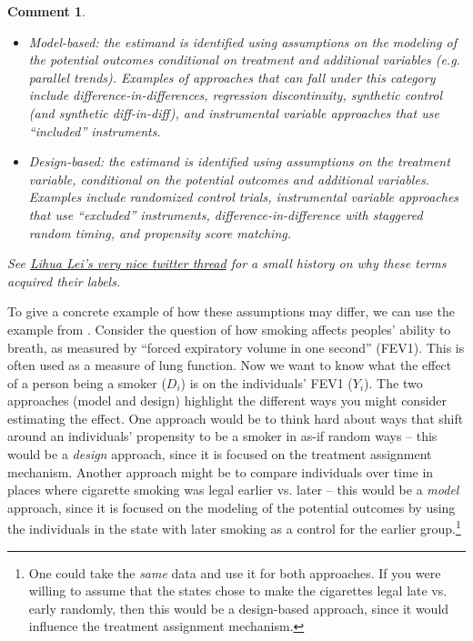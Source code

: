 \documentclass{tufte-handout}
\theoremstyle{break}
\newtheorem{cmt}{Comment}
\begin{document}
\begin{boxF}
  \begin{cmt}
    \begin{itemize}
      \item Model-based: the estimand is
            identified using assumptions on the modeling of the potential outcomes conditional on treatment and additional variables
            (e.g. parallel trends). Examples of approaches that can fall under this category include difference-in-differences, regression discontinuity, synthetic control (and synthetic diff-in-diff), and instrumental variable approaches that use ``included'' instruments.
      \item Design-based: the estimand is identified using assumptions on the treatment variable,
            conditional on the potential outcomes and additional variables. Examples include randomized control trials, instrumental variable approaches that use ``excluded'' instruments, difference-in-difference with staggered random timing, and propensity score matching.
    \end{itemize}
    See \href{https://twitter.com/lihua_lei_stat/status/1479700463343714306?s=20&t=pKi-XTp3e89Rn8KV8b3KEA}{Lihua Lei's very nice twitter thread} for a small history on why these terms acquired their labels.
  \end{cmt}
\end{boxF}

To give a concrete example of how these assumptions may differ, we can use the example from \citet{robins1992estimating}. Consider the question of how smoking affects peoples' ability to breath, as measured by ``forced expiratory volume in one second'' (FEV1). This is often used as a measure of lung function. Now we want to know what the effect of a person being a smoker ($D_{i}$) is on the individuals' FEV1 ($Y_{i}$).  The two approaches (model and design) highlight the different ways you might consider estimating the effect. One approach would be to think hard about ways that shift around an individuals' propensity to be a smoker in as-if random ways -- this would be a \emph{design} approach, since it is focused on the treatment assignment mechanism.  Another approach might be to compare individuals over time in places where cigarette smoking was legal earlier vs. later -- this would be a \emph{model} approach, since it is focused on the modeling of the potential outcomes by using the individuals in the state with later smoking as a control for the earlier group.\footnote{One could take the \emph{same} data and use it for both approaches. If you were willing to assume that the states chose to make the cigarettes legal late vs. early randomly, then this would be a design-based approach, since it would influence the treatment assignment mechanism.}
\end{document}
